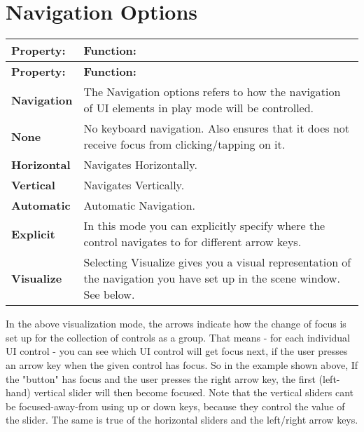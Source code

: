 \chapter{Navigation Options}
\hypertarget{md__library_2_package_cache_2com_8unity_8ugui_0d1_80_80_2_documentation_0i_2script-_selectable_navigation}{}\label{md__library_2_package_cache_2com_8unity_8ugui_0d1_80_80_2_documentation_0i_2script-_selectable_navigation}
\label{md__library_2_package_cache_2com_8unity_8ugui_0d1_80_80_2_documentation_0i_2script-_selectable_navigation_autotoc_md1420}%
%
 

\tabulinesep=1mm
\begin{longtabu}spread 0pt [c]{*{2}{|X[-1]}|}
\hline
\cellcolor{\tableheadbgcolor}\textbf{ {\bfseries{Property\+:}}   }&\cellcolor{\tableheadbgcolor}\textbf{ {\bfseries{Function\+:}}    }\\
\endfirsthead
\hline
\endfoot
\hline
\cellcolor{\tableheadbgcolor}\textbf{ {\bfseries{Property\+:}}   }&\cellcolor{\tableheadbgcolor}\textbf{ {\bfseries{Function\+:}}    }\\
\endhead
{\bfseries{Navigation}}   &The Navigation options refers to how the navigation of UI elements in play mode will be controlled.    \\
{\bfseries{None}}   &No keyboard navigation. Also ensures that it does not receive focus from clicking/tapping on it.    \\
{\bfseries{Horizontal}}   &Navigates Horizontally.    \\
{\bfseries{Vertical}}   &Navigates Vertically.    \\
{\bfseries{Automatic}}   &Automatic Navigation.    \\
{\bfseries{Explicit}}   &In this mode you can explicitly specify where the control navigates to for different arrow keys.    \\
{\bfseries{Visualize}}   &Selecting Visualize gives you a visual representation of the navigation you have set up in the scene window. See below.   \\
\end{longtabu}






In the above visualization mode, the arrows indicate how the change of focus is set up for the collection of controls as a group. That means -\/ for each individual UI control -\/ you can see which UI control will get focus next, if the user presses an arrow key when the given control has focus. So in the example shown above, If the "{}button"{} has focus and the user presses the right arrow key, the first (left-\/hand) vertical slider will then become focused. Note that the vertical sliders can\textquotesingle{}t be focused-\/away-\/from using up or down keys, because they control the value of the slider. The same is true of the horizontal sliders and the left/right arrow keys. 